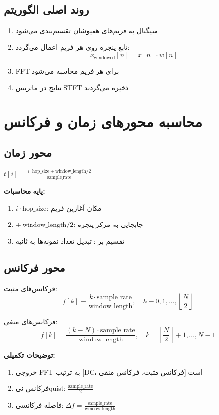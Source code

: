 \documentclass{article}
\begin{document}
\begin{RTL}
\subsection{روند اصلی الگوریتم}
\begin{enumerate}[label=\alph*)]
\item سیگنال به فریم‌های همپوشان تقسیم‌بندی می‌شود
\item تابع پنجره روی هر فریم اعمال می‌گردد:
\[
x_\text{windowed}[n] = x[n] \cdot w[n]
\]
\item FFT برای هر فریم محاسبه می‌شود
\item نتایج در ماتریس STFT ذخیره می‌گردند
\end{enumerate}

\section{محاسبه محورهای زمان و فرکانس}
\subsection{محور زمان}
\beginL $
t[i] = \frac{i \cdot \text{hop\_size} + \text{window\_length}/2}{\text{sample\_rate}}
$\\ \endL

\textbf{پایه محاسبات:}
\begin{enumerate}[label=\alph*)]
\item $i \cdot \text{hop\_size}$: مکان آغازین فریم
\item $+\ \text{window\_length}/2$: جابجایی به مرکز پنجره
\item تقسیم بر : تبدیل تعداد نمونه‌ها به ثانیه
\end{enumerate}

\subsection{محور فرکانس}
فرکانس‌های مثبت:
\[
f[k] = \frac{k \cdot \text{sample\_rate}}{\text{window\_length}}, \quad k = 0, 1, ..., \left\lfloor \frac{N}{2} \right\rfloor
\]

فرکانس‌های منفی:
\[
f[k] = \frac{(k - N) \cdot \text{sample\_rate}}{\text{window\_length}}, \quad k = \left\lfloor \frac{N}{2} \right\rfloor + 1, ..., N-1
\]

\textbf{توضیحات تکمیلی:}
\begin{enumerate}[label=\alph*)]
\item خروجی FFT به ترتیب [DC، فرکانس مثبت، فرکانس منفی] است
\item فرکانس نیquist: $\frac{\text{sample\_rate}}{2}$
\item فاصله فرکانسی: $\Delta f = \frac{\text{sample\_rate}}{\text{window\_length}}$
\end{enumerate}


\end{RTL}
\end{document}
